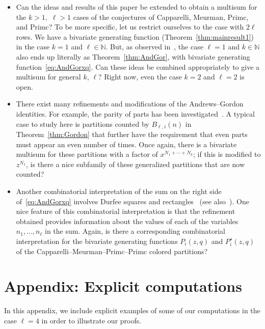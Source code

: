 \documentclass[10pt,a4paper]{amsart}
\numberwithin{equation}{section}
\theoremstyle{definition}
\newcommand{\NN}{\mathbb{N}}
\begin{document}
\begin{itemize}\itemsep=0pt
\item Can the ideas and results of this paper be extended to obtain a multisum for the $k>1,$ $\ell>1$ cases of the conjectures of Capparelli, Meurman, Primc, and Primc? To be more specific, let us restrict ourselves to the case with $2\ell$ rows. We have a bivariate generating function (Theorem~\ref{thm:mainresult1}) in the case $k=1$ and $\ell \in \NN$. But, as observed in~\cite{CMPP}, the case $\ell=1$ and $k\in\NN$ also ends up literally as Theorem~\ref{thm:AndGor}, with bivariate generating function~\eqref{eq:AndGorxq}. Can these ideas be combined appropriately to give a multisum for general $k$, $\ell$? Right now, even the case $k=2$ and $\ell=2$ is open.

\item There exist many refinements and modifications of the Andrews--Gordon identities. For example, the parity of parts has been investigated~\cite{AndParity,KimYee,KurThesis,KurParity}. A typical case to study here is partitions counted by $B_{\ell,i}(n)$ in Theorem~\ref{thm:Gordon} that further have the requirement that even parts must appear an even number of times. Once again, there is a bivariate multisum for these partitions with a factor of $x^{N_1+\cdots+N_k}$; if this is modified to $z^{N_1}$, is there a nice subfamily of these generalized partitions that are now counted?

\item Another combinatorial interpretation of the sum on the right side of~\eqref{eq:AndGorxq} involves Durfee squares and rectangles~\cite{AndDurf} (see also~\cite{ADJM}). One nice feature of this combinatorial interpretation is that the refinement obtained provides information about the values of each of the variables $n_1,\dots,n_\ell$ in the sum. Again, is there a corresponding combinatorial interpretation for the bivariate generating functions $P_i(z,q)$ and $P_i^\star(z,q)$ of the Capparelli--Meurman--Primc--Primc colored partitions?
\end{itemize}


\appendix


\section{Appendix: Explicit computations}\label{sec:appendix}
In this appendix, we include explicit examples of some of our computations in the case $\ell=4$ in order to illustrate our proofs.
\end{document}
